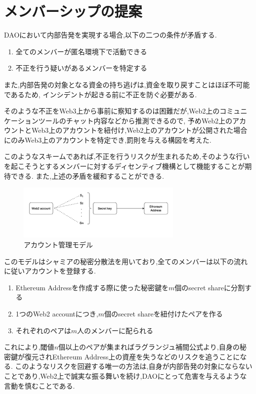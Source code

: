 \documentclass[10pt,twocolumn,a4j]{jarticle}
\begin{document}
\section{\normalsize メンバーシップの提案}
DAOにおいて内部告発を実現する場合,以下の二つの条件が矛盾する.
\begin{enumerate}
  \item 全てのメンバーが匿名環境下で活動できる
  \item 不正を行う疑いがあるメンバーを特定する
\end{enumerate}
また,内部告発の対象となる資金の持ち逃げは,資金を取り戻すことはほぼ不可能であるため,
インシデントが起きる前に不正を防ぐ必要がある.

そのような不正をWeb3上から事前に察知するのは困難だが,Web2上のコミュニケーションツールのチャット内容などから推測できるので,
予めWeb2上のアカウントとWeb3上のアカウントを紐付け,Web2上のアカウントが公開された場合にのみWeb3上のアカウントを特定でき,罰則を与える構図を考えた.

このようなスキームであれば,不正を行うリスクが生まれるため,そのような行いを起こそうとするメンバーに対するディセンティブ機構として機能することが期待できる.
また,上述の矛盾を緩和することができる.
\begin{figure}[htbp]
  \begin{center}
    \includegraphics[width=80mm]{account.png}
    \caption{アカウント管理モデル}
  \end{center}
\end{figure}
このモデルはシャミアの秘密分散法を用いており,全てのメンバーは以下の流れに従いアカウントを登録する.
\begin{enumerate}
  \item Ethereum Addressを作成する際に使った秘密鍵を$m$個のsecret shareに分割する
  \item 1つのWeb2 accountにつき,$m$個のsecret shareを紐付けたペアを作る
  \item それぞれのペアは$m$人のメンバーに配られる
\end{enumerate}
これにより,閾値$n$個以上のペアが集まればラグランジュ補間公式より,自身の秘密鍵が復元されEthereum Address上の資産を失うなどのリスクを追うことになる.
このようなリスクを回避する唯一の方法は,自身が内部告発の対象にならないことであり,Web2上で誠実な振る舞いを続け,DAOにとって危害を与えるような言動を慎むことである.
\end{document}
